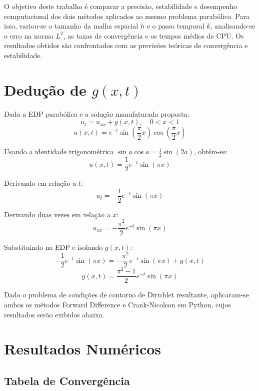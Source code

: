 \documentclass[10pt,twocolumn]{article}
\begin{document}
O objetivo deste trabalho é comparar a precisão, estabilidade e desempenho computacional dos dois métodos aplicados ao mesmo problema parabólico. Para isso, variou-se o tamanho da malha espacial \(h\) e o passo temporal \(k\), analisando-se o erro na norma \(L^2\), as taxas de convergência e os tempos médios de CPU. Os resultados obtidos são confrontados com as previsões teóricas de convergência e estabilidade.

\newpage
\section*{Dedução de \( g(x,t) \)}

Dada a EDP parabólica e a solução manufaturada proposta:
\[
u_t = u_{xx} + g(x,t), \quad 0 < x < 1
\]
\[
u(x,t) = e^{-t} \sin\left( \frac{\pi}{2} x \right) \cos\left( \frac{\pi}{2} x \right)
\]

Usando a identidade trigonométrica \(\sin a \cos a = \frac{1}{2}\sin(2a)\), obtém-se:
\[
u(x,t) = \frac{1}{2} e^{-t} \sin(\pi x)
\]

Derivando em relação a \(t\):
\[
u_t = -\frac{1}{2} e^{-t} \sin(\pi x)
\]

Derivando duas vezes em relação a \(x\):
\[
u_{xx} = -\frac{\pi^2}{2} e^{-t} \sin(\pi x)
\]

Substituindo na EDP e isolando \(g(x,t)\):
\[
-\frac{1}{2} e^{-t} \sin(\pi x) = -\frac{\pi^2}{2} e^{-t} \sin(\pi x) + g(x,t)
\]
\[
\boxed{g(x,t) = \frac{\pi^2 - 1}{2} e^{-t} \sin(\pi x)}
\]

Dado o problema de condições de contorno de Dirichlet resultante, aplicaram-se ambos os métodos Forward Difference e Crank-Nicolson em Python, cujos resultados serão exibidos abaixo.

\newpage

\section{Resultados Numéricos}

\subsection{Tabela de Convergência}

\begin{table}[H]
\centering
{}
\caption{\small Resultados do método Forward Difference para diferentes refinamentos de malha}
\end{table}
\end{document}
